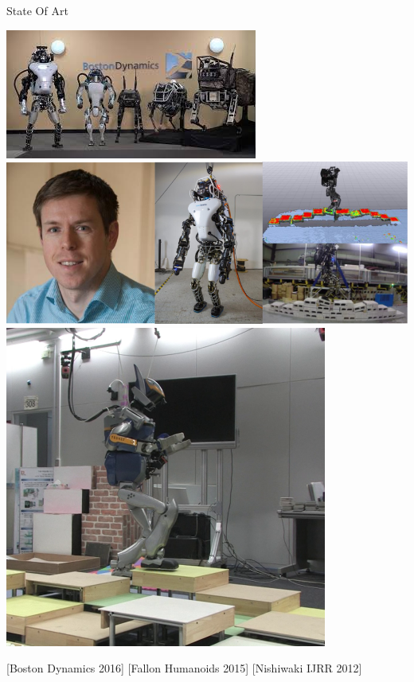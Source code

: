 \begin{frame}{State Of Art}

\begin{center}
\includegraphics[trim={0.0cm 0.0cm 3.0cm 0.0cm}, clip,
height=0.4\textheight ,keepaspectratio]
{figures/stateoftheart/bostondynamics.jpeg}\hspace*{0.3cm}
\includegraphics[trim={20.0cm 0.0cm 0.0cm 0.0cm}, clip,
height=0.4\textheight , keepaspectratio]
{figures/stateoftheart/humanoids2015.png}\hspace*{0.3cm}
\includegraphics[height=0.4\textheight , keepaspectratio]
{figures/stateoftheart/rsj30_humanoid_navigaion_nishiwaki_aist.png}

[Boston Dynamics 2016] %
[Fallon Humanoids 2015] %
[Nishiwaki IJRR 2012]
\end{center}

\end{frame}

